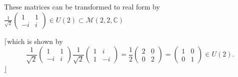 \documentclass[aps,preprint]{revtex4}
\begin{document}
These matrices can be transformed to real form by $\frac{1}{\sqrt{2}}\left( 
\begin{array}{cc}
1 & 1 \\ 
-i & i%
\end{array}%
\right) \in U\left( 2\right) \subset \mathcal{M}\left( 2,2,\mathbb{C}\right) 
$

$\lceil $which is shown by 
\begin{equation}
\frac{1}{\sqrt{2}}\left( 
\begin{array}{cc}
1 & 1 \\ 
-i & i%
\end{array}%
\right) \frac{1}{\sqrt{2}}\left( 
\begin{array}{cc}
1 & i \\ 
1 & -i%
\end{array}%
\right) =\frac{1}{2}\left( 
\begin{array}{cc}
2 & 0 \\ 
0 & 2%
\end{array}%
\right) =\left( 
\begin{array}{cc}
1 & 0 \\ 
0 & 1%
\end{array}%
\right) \in U\left( 2\right) .
\end{equation}%
$\rfloor $%
\end{document}
